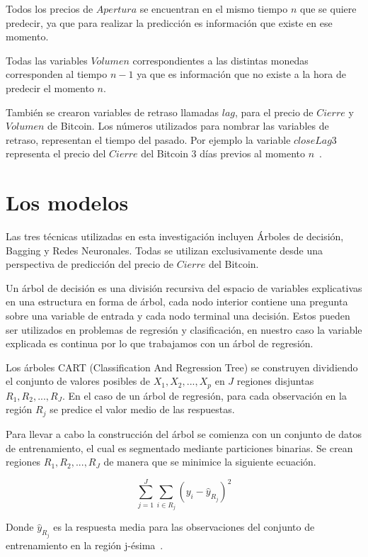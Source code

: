 \documentclass[a4paper,12pt,twocolumn]{article}
\begin{document}
Todos los precios de $Apertura$ se encuentran en el mismo tiempo $n$ que se quiere predecir, ya que para realizar la predicción es información que existe en ese momento. 

Todas las variables $Volumen$ correspondientes a las distintas monedas corresponden al tiempo $n-1$ ya que es información que no existe a la hora de predecir el momento $n$.

También se crearon variables  de retraso llamadas $lag$, para el precio de $Cierre$ y $Volumen$ de Bitcoin. Los números utilizados para nombrar las variables de retraso, representan el tiempo del pasado. Por ejemplo la variable $closeLag3$ representa el precio del $Cierre$ del Bitcoin 3 días previos al momento $n$~\cite{forecastinBitcoinClosing}.  

\section{Los modelos}

Las tres técnicas utilizadas en esta investigación incluyen Árboles de decisión, Bagging y Redes Neuronales. Todas se utilizan exclusivamente desde una perspectiva de predicción del precio de $Cierre$ del Bitcoin. 

Un árbol de decisión es una división recursiva del espacio de variables explicativas en una estructura en forma de árbol, cada nodo interior contiene una pregunta sobre una variable de entrada y cada nodo terminal una decisión. Estos pueden ser utilizados en problemas de regresión y clasificación, en nuestro caso la variable explicada es continua por lo que trabajamos con un árbol de regresión.  

Los árboles CART (Classification And Regression Tree) se construyen dividiendo el conjunto de valores posibles de $X_1,X_2,...,X_p$ en $J$ regiones disjuntas $R_1, R_2,..., R_J$. En el caso de un árbol de regresión, para cada observación en la región $R_j$ se predice el valor medio de las respuestas.

Para llevar a cabo la construcción del árbol se comienza con un conjunto de datos de entrenamiento, el cual es segmentado mediante particiones binarias. Se crean regiones $R_1, R_2,..., R_J$ de manera que se minimice la siguiente ecuación.

$$
\sum_{j=1}^{J} \sum_{i \in R_{j}}\left(y_{i}-\hat{y}_{R_{j}}\right)^{2}
$$

Donde $\hat{y}_{R_{j}}$ es la respuesta media para las observaciones del conjunto de entrenamiento en la región j-ésima~\cite{libroCurso}.
\end{document}
